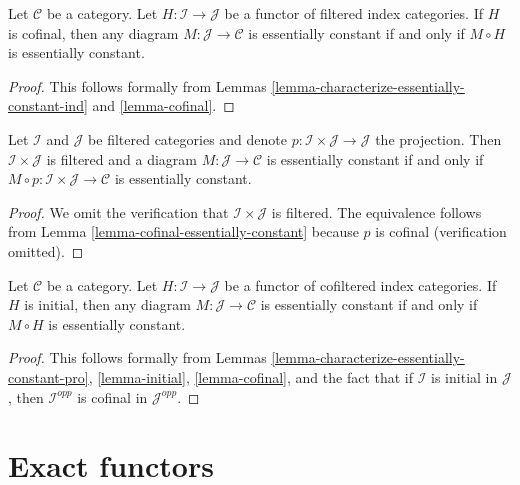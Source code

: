 \begin{lemma}
\label{lemma-cofinal-essentially-constant}
Let $\mathcal{C}$ be a category. Let $H : \mathcal{I} \to \mathcal{J}$
be a functor of filtered index categories. If $H$ is cofinal, then
any diagram $M : \mathcal{J} \to \mathcal{C}$ is essentially constant
if and only if $M \circ H$ is essentially constant.
\end{lemma}

\begin{proof}
This follows formally from
Lemmas \ref{lemma-characterize-essentially-constant-ind} and
\ref{lemma-cofinal}.
\end{proof}

\begin{lemma}
\label{lemma-essentially-constant-over-product}
Let $\mathcal{I}$ and $\mathcal{J}$ be filtered categories and denote
$p : \mathcal{I} \times \mathcal{J} \to \mathcal{J}$ the projection.
Then $\mathcal{I} \times \mathcal{J}$ is filtered and a diagram
$M : \mathcal{J} \to \mathcal{C}$ is essentially constant if and only
if $M \circ p : \mathcal{I} \times \mathcal{J} \to \mathcal{C}$
is essentially constant.
\end{lemma}

\begin{proof}
We omit the verification that $\mathcal{I} \times \mathcal{J}$ is
filtered. The equivalence follows from
Lemma \ref{lemma-cofinal-essentially-constant}
because $p$ is cofinal (verification omitted).
\end{proof}

\begin{lemma}
\label{lemma-initial-essentially-constant}
Let $\mathcal{C}$ be a category. Let $H : \mathcal{I} \to \mathcal{J}$
be a functor of cofiltered index categories. If $H$ is initial, then
any diagram $M : \mathcal{J} \to \mathcal{C}$ is essentially constant
if and only if $M \circ H$ is essentially constant.
\end{lemma}

\begin{proof}
This follows formally from
Lemmas \ref{lemma-characterize-essentially-constant-pro},
\ref{lemma-initial}, \ref{lemma-cofinal}, and
the fact that if $\mathcal{I}$ is initial in $\mathcal{J}$,
then $\mathcal{I}^{opp}$ is cofinal in $\mathcal{J}^{opp}$.
\end{proof}





\section{Exact functors}
\label{section-exact-functor}


